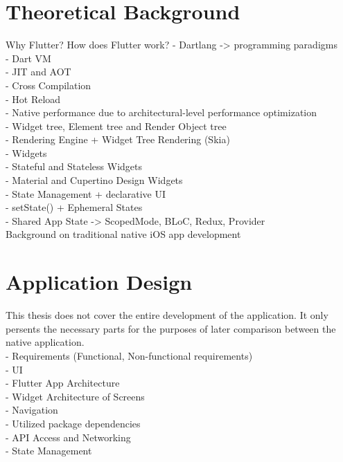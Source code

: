 \chapter{Theoretical Background}
Why Flutter? How does Flutter work?
- Dartlang -> programming paradigms\\
- Dart VM\\
- JIT and AOT\\
- Cross Compilation\\ 
- Hot Reload\\
- Native performance due to architectural-level performance optimization\\
- Widget tree, Element tree and Render Object tree\\ 
- Rendering Engine + Widget Tree Rendering (Skia)\\
- Widgets\\
- Stateful and Stateless Widgets\\
- Material and Cupertino Design Widgets\\
- State Management + declarative UI\\ 
- setState() + Ephemeral States\\
- Shared App State -> ScopedMode, BLoC, Redux, Provider\\
Background on traditional native iOS app development\\


\chapter{Application Design}
This thesis does not cover the entire development of the application. It only persents the necessary parts for the purposes of later comparison between the native application.\\
- Requirements (Functional, Non-functional requirements)\\
- UI\\
- Flutter App Architecture\\
- Widget Architecture of Screens\\ 
- Navigation\\
- Utilized package dependencies\\
- API Access and Networking\\
- State Management\\




